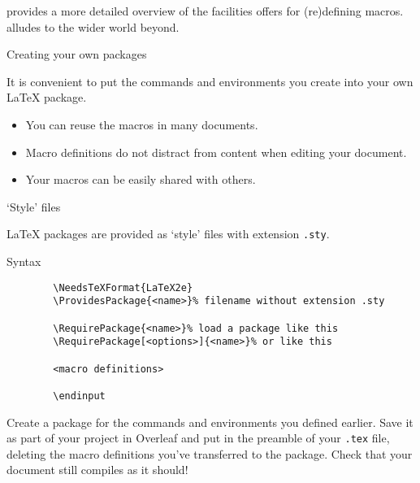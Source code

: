 provides a more detailed overview of the facilities \LaTeXe{} offers for (re)defining macros.
 alludes to the wider world beyond.


\begin{frame}{Creating your own packages}

  It is convenient to put the commands and environments you create into your own \LaTeX{} package.
  \begin{itemize}
  	\item You can reuse the macros in many documents.
	\item Macro definitions do not distract from content when editing your document.
	\item Your macros can be easily shared with others.
  \end{itemize}

\end{frame}

\begin{frame}[fragile]{‘Style’ files}

  \LaTeX{} packages are provided as ‘style’ files with extension \texttt{.sty}.
  \begin{block}{Syntax}
	\begin{verbatim}
		\NeedsTeXFormat{LaTeX2e}
		\ProvidesPackage{<name>}% filename without extension .sty

		\RequirePackage{<name>}% load a package like this
		\RequirePackage[<options>]{<name>}% or like this

		<macro definitions>

		\endinput
	\end{verbatim}
  \end{block}

\end{frame}

\begin{exercise}
	Create a package for the commands and environments you defined earlier.
	Save it as part of your project in Overleaf and put  in the preamble of your \texttt{.tex} file, deleting the macro definitions you've transferred to the package.
	Check that your document still compiles as it should!
\end{exercise}



